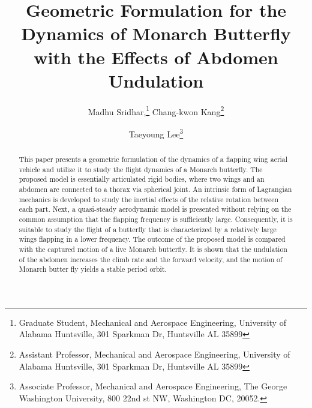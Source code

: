 \documentclass[conf]{new-aiaa}
\title{Geometric Formulation for the Dynamics of Monarch Butterfly with the Effects of Abdomen Undulation}
\author{Madhu Sridhar,\footnote{Graduate Student, Mechanical and Aerospace Engineering, University of Alabama Huntsville, 301 Sparkman Dr, Huntsville AL 35899}
Chang-kwon Kang\footnote{Assistant Professor, Mechanical and Aerospace Engineering, University of Alabama Huntsville, 301 Sparkman Dr, Huntsville AL 35899}}
\affil{University of Alabama Huntsville, Huntsville AL, 35899}
\author{Taeyoung Lee\footnote{Associate Professor, Mechanical and Aerospace Engineering, The George Washington University, 800 22nd st NW, Washington DC, 20052.}}
\affil{The George Washington University, Washington DC, 20052}
\newcommand{\SO}{\ensuremath{\operatorname{SO(3)}}}
\renewcommand{\Re}{\ensuremath{\mathbb{R}}}
\newcommand{\Sph}{\ensuremath{\mathsf{S}}}
\begin{document}
\maketitle

\begin{abstract}
    This paper presents a geometric formulation of the dynamics of a flapping wing aerial vehicle and utilize it to study the flight dynamics of a Monarch butterfly. 
    The proposed model is essentially articulated rigid bodies, where two wings and an abdomen are connected to a thorax via spherical joint.
    An intrinsic form of Lagrangian mechanics is developed to study the inertial effects of the relative rotation between each part. 
    Next, a quasi-steady aerodynamic model is presented without relying on the common assumption that the flapping frequency is sufficiently large. 
    Consequently, it is suitable to study the flight of a butterfly that is characterized by a relatively large wings flapping in a lower frequency. 
    The outcome of the proposed model is compared with the captured motion of a live Monarch butterfly.
    It is shown that the undulation of the abdomen increases the climb rate and the forward velocity, and the motion of Monarch butter fly yields a stable period orbit. 
\end{abstract}


\end{document}
